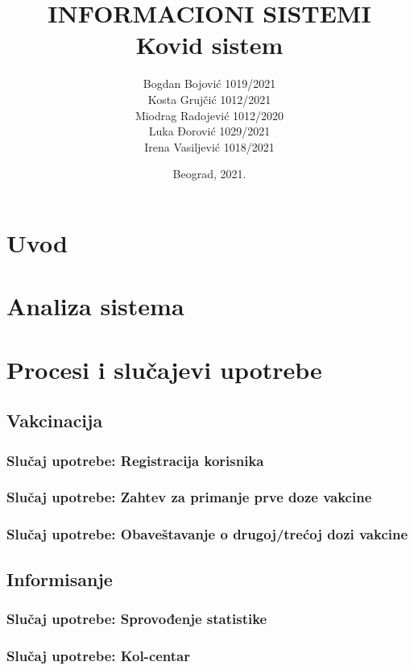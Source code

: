 \documentclass[titlepage]{article}
\title{INFORMACIONI SISTEMI\\Kovid sistem}
\author{
Bogdan Bojović 1019/2021\\
Kosta Grujčić 1012/2021\\
Miodrag Radojević 1012/2020\\
Luka Đorović 1029/2021\\
Irena Vasiljević 1018/2021
}
\date{Beograd, 2021.}
\begin{document}
\maketitle
\tableofcontents

\newpage

\section{Uvod}

\section{Analiza sistema}

\section{Procesi i slučajevi upotrebe}


\subsection{Vakcinacija}
\subsubsection{Slučaj upotrebe: Registracija korisnika}
\subsubsection{Slučaj upotrebe: Zahtev za primanje prve doze vakcine}
\subsubsection{Slučaj upotrebe: Obaveštavanje o drugoj/trećoj dozi vakcine}

\subsection{Informisanje}
\subsubsection{Slučaj upotrebe: Sprovođenje statistike}
\subsubsection{Slučaj upotrebe: Kol-centar}
\end{document}
